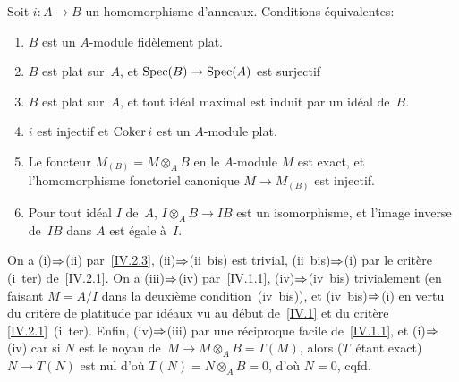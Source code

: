 \begin{proposition}
\label{IV.2.6}
Soit $i \colon A \to B$ un homomorphisme d'anneaux. Conditions
\'equivalentes:
\begin{enumerate}\item[(i)] $B$ est un $A$-module fid\`element plat.
\item[(ii)] $B$ est plat sur~$A$, et $\Spec (B) \to \Spec (A)$ est
surjectif
\item[(ii~bis)] $B$ est plat sur~$A$, et tout id\'eal maximal est
induit par un id\'eal de~$B$.
\item[(iii)] $i$ est injectif et $\operatorname{Coker} i$ est un $A$-module plat.
\item[(iv)] Le foncteur $M_{(B)}=M \otimes_{A} B$ en le $A$-module $M$
est exact, et l'homomorphisme fonctoriel canonique $M \to M_{(B)}$ est
injectif.
\item[(iv~bis)] Pour tout id\'eal $I$ de~$A$, $I \otimes_{A} B \to
IB$ est un isomorphisme, et l'image inverse de~$IB$ dans $A$ est
\'egale \`a~$I$.
\end{enumerate}
\end{proposition}

On a (i)$\To$(ii) par~\ref{IV.2.3},
(ii)$\To$(ii~bis) est trivial, (ii~bis)$\To$(i)
par le crit\`ere (i~ter) de~\ref{IV.2.1}. On a
(iii)$\To$(iv) par~\ref{IV.1.1}, (iv)$\To$(iv~bis)
trivialement (en faisant $M=A/I$ dans la deuxi\`eme
condition~(iv~bis)), et (iv~bis)$\To$(i) en vertu du
crit\`ere de platitude par id\'eaux vu au d\'ebut de~\ref{IV.1}
et du crit\`ere \ref{IV.2.1}~(i~ter). Enfin,
(iv)$\To$(iii) par une r\'eciproque facile
de~\ref{IV.1.1}, et (i)$\To$(iv) car
si $N$ est le noyau de~$M \to M \otimes_{A}B =T(M)$, alors ($T$~\'etant exact) $N \to T(N)$ est nul d'o\`u $T(N)=N \otimes_{A}B
=0$, d'o\`u $N=0$, cqfd.

